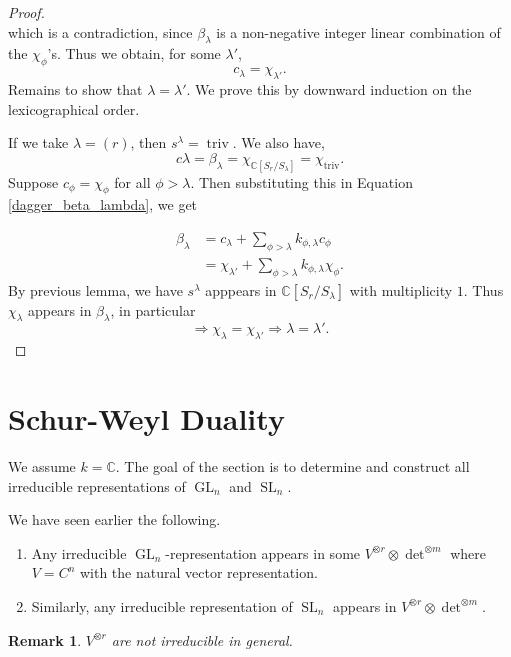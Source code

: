 \documentclass[10pt]{article}
\newtheorem{remark}{Remark}[section]
\numberwithin{equation}{theorem}
\DeclareMathOperator{\triv}{triv}
\DeclareMathOperator{\GL}{GL}
\DeclareMathOperator{\SL}{SL}
\newcommand{\C}[0]{\mathbb{C}}
\begin{document}
\begin{proof}
\begin{equation*}
  \end{equation*}
  which is a contradiction, since $\beta_\lambda$ is a non-negative integer linear combination of the $\chi_\phi$'s. Thus we obtain, for some $\lambda'$,
  \begin{equation*}
    c_\lambda = \chi_{\lambda'}.
  \end{equation*}
  Remains to show that $\lambda = \lambda'$. We prove this by downward induction on the lexicographical order.\\
  \par If we take $\lambda = (r)$, then $s^\lambda = \triv$. We also have,
  \begin{equation*}
    c\lambda = \beta_\lambda = \chi_{\C[S_r/S_\lambda]} = \chi_{\triv}.
  \end{equation*}  Suppose $c_\phi = \chi_\phi$ for all $\phi>\lambda$. Then substituting this in Equation \eqref{dagger_beta_lambda}, we get 

  \begin{align*}
    \beta_\lambda & = c_\lambda + \sum_{\phi>\lambda}k_{\phi,\lambda}c_\phi\\
    & = \chi_{\lambda'}+\sum_{\phi>\lambda}k_{\phi,\lambda}\chi_{\phi}.
  \end{align*}
  By previous lemma, we have $s^\lambda$ apppears in $\C[S_r/S_\lambda]$ with multiplicity $1$. Thus $\chi_\lambda$ appears in $\beta_\lambda$, in particular 
  \begin{equation*}
    \Rightarrow \chi_\lambda = \chi_{\lambda'} \Rightarrow \lambda = \lambda'.
  \end{equation*}
\end{proof}

\section{Schur-Weyl Duality}
We assume $k=\C$. The goal of the section is to determine and construct all irreducible representations of 
$\GL_n$ and $\SL_n$.\\
\par We have seen earlier the following.
\begin{enumerate}
  \item Any irreducible $\GL_n$-representation appears in some $V^{\otimes r}\otimes \det^{\otimes m}$ where $V = C^n$ with the natural vector representation.
  \item Similarly, any irreducible representation of $\SL_n$ appears in $V^{\otimes r}\otimes \det^{\otimes m}$.
\end{enumerate}
\begin{remark}
  $V^{\otimes r}$ are not irreducible in general. 
\end{remark}
\end{document}
